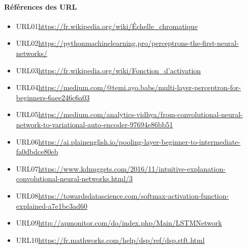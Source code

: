 \renewcommand{\listfigurename}{Liste des illustrations}
\listoffigures
\addcontentsline{toc}{chapter}{\listfigurename} %

\paragraph{Références des URL}

\begin{itemize}
\item URL01\quad\href{https://fr.wikipedia.org/wiki/\%C3\%89chelle\_chromatique}{https://fr.wikipedia.org/wiki/Échelle\_chromatique}
\item URL02\quad\href{https://pythonmachinelearning.pro/perceptrons-the-first-neural-networks/}{https://pythonmachinelearning.pro/perceptrons-the-first-neural-networks/}
\item URL03\quad\href{https://fr.wikipedia.org/wiki/Fonction\_d\%27activation}{https://fr.wikipedia.org/wiki/Fonction\_d'activation}
\item URL04\quad\href{https://medium.com/@temi.ayo.babs/multi-layer-perceptron-for-beginners-6aee246c6a03}{https://medium.com/@temi.ayo.babs/multi-layer-perceptron-for-beginners-6aee246c6a03}
\item URL05\quad\href{https://medium.com/analytics-vidhya/from-convolutional-neural-network-to-variational-auto-encoder-97694e86bb51 }{https://medium.com/analytics-vidhya/from-convolutional-neural-network-to-variational-auto-encoder-97694e86bb51 }
\item URL06\quad\href{https://ai.plainenglish.io/pooling-layer-beginner-to-intermediate-fa0dbdce80eb}{https://ai.plainenglish.io/pooling-layer-beginner-to-intermediate-fa0dbdce80eb}
\item URL07\quad\href{https://www.kdnuggets.com/2016/11/intuitive-explanation-convolutional-neural-networks.html/3}{https://www.kdnuggets.com/2016/11/intuitive-explanation-convolutional-neural-networks.html/3}
\item URL08\quad\href{https://towardsdatascience.com/softmax-activation-function-explained-a7e1bc3ad60}{https://towardsdatascience.com/softmax-activation-function-explained-a7e1bc3ad60}
\item URL09\quad\href{http://apmonitor.com/do/index.php/Main/LSTMNetwork}{http://apmonitor.com/do/index.php/Main/LSTMNetwork}
\item URL10\quad\href{https://fr.mathworks.com/help/dsp/ref/dsp.stft.html}{https://fr.mathworks.com/help/dsp/ref/dsp.stft.html}
\end{itemize}